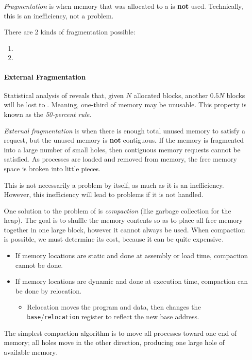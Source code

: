 \begin{definition}[Fragmentation]\label{def:Fragmentation}
  \emph{Fragmentation} is when memory that was allocated to a  is \textbf{not} used.
  Technically, this is an inefficiency, not a problem.

  There are 2 kinds of fragmentation possible:
  \begin{enumerate}[noitemsep]
  \item {}
  \item {}
  \end{enumerate}
\end{definition}

\paragraph{External Fragmentation}\label{par:External_Fragmentation}
Statistical analysis of  reveals that, given $N$ allocated blocks, another $0.5 N$ blocks will be lost to .
Meaning, one-third of memory may be unusable.
This property is known as the \emph{50-percent rule}.

\begin{definition}\label{def:External_Fragmentation}
  \emph{External fragmentation} is when there is enough total unused memory to satisfy a request, but the unused memory is \textbf{not} contiguous.
  If the memory is fragmented into a large number of small holes, then contiguous memory requests cannot be satisfied.
  As processes are loaded and removed from memory, the free memory space is broken into little pieces.

  This is not necessarily a problem by itself, as much as it is an inefficiency.
  However, this inefficiency will lead to problems if it is not handled.
\end{definition}

One solution to the problem of  is \emph{compaction} (like garbage collection for the heap).
The goal is to shuffle the memory contents so as to place all free memory together in one large block, however it cannot always be used.
When compaction is possible, we must determine its cost, because it can be quite expensive.
\begin{itemize}[noitemsep]
\item If memory locations are static and done at assembly or load time, compaction cannot be done.
\item If memory locations are dynamic and done at execution time, compaction can be done by relocation.
  \begin{itemize}[noitemsep]
  \item Relocation moves the program and data, then changes the \texttt{base}/\texttt{relocation} register to reflect the new base address.
  \end{itemize}
\end{itemize}
The simplest compaction algorithm is to move all processes toward one end of memory; all holes move in the other direction, producing one large hole of available memory.

